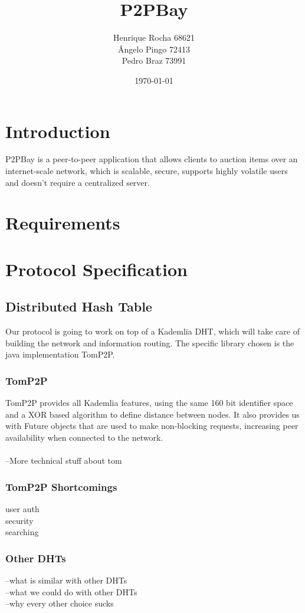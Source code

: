 \documentclass[a4paper]{article}
\title{P2PBay}
\author{Henrique Rocha 68621\\
Ângelo Pingo 72413\\
Pedro Braz 73991}
\date{\today}
\begin{document}
\maketitle



\section{Introduction}
 P2PBay is a peer-to-peer application that allows clients to auction items over an internet-scale network, which is scalable, secure, supports highly volatile users and doesn't require a centralized server. 

\section{Requirements}


\section{Protocol Specification}

\subsection{Distributed Hash Table}
	Our protocol is going to work on top of a Kademlia DHT, which will take care of building the network and information routing. The specific library chosen is the java implementation TomP2P.

\subsubsection{TomP2P}
	TomP2P provides all Kademlia features, using the same 160 bit identifier space and a XOR based algorithm to define distance between nodes. It also provides us with Future objects that are used to make non-blocking requests, increasing peer availability when connected to the network.  
   \\\\--More technical stuff about tom
   
\subsubsection{TomP2P Shortcomings}
user auth \\ security \\ searching

   
\subsubsection{Other DHTs}
	--what is similar with other DHTs
	\\--what we could do with other DHTs
	\\--why every other choice sucks
\end{document}
